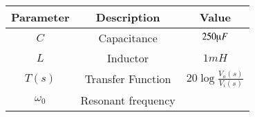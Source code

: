 \begin{tabular}{|c|c|c|}
\hline
    \textbf{Parameter} & \textbf{Description} & \textbf{Value} \\
    \hline
    $C$ & Capacitance & $250\micro F$\\
    \hline
    $L$ & Inductor & $1mH$\\
    \hline
    $T(s)$ & Transfer Function & $20\log\frac{V_o(s)}{V_i(s)}$\\
    \hline
    $\omega_0$ & Resonant frequency &  \\
    \hline
    \end{tabular}

